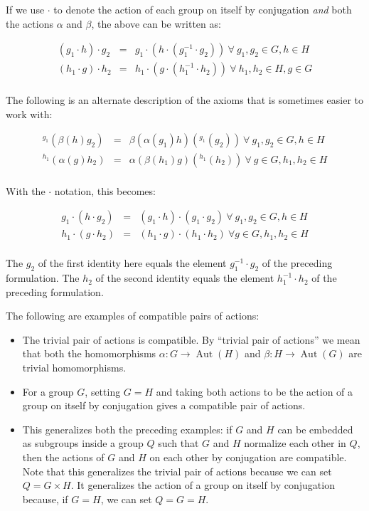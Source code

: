 \documentclass{ucetd}
\begin{document}
If we use $\cdot$ to denote the action of each group on itself by
conjugation {\em and} both the actions $\alpha$ and $\beta$, the above
can be written as:

\begin{eqnarray*}
  (g_1 \cdot h) \cdot g_2 & = & g_1 \cdot (h \cdot (g_1^{-1} \cdot g_2)) \ \forall \ g_1,g_2 \in G, h \in H\\
  (h_1 \cdot g) \cdot h_2 & = & h_1 \cdot (g \cdot (h_1^{-1} \cdot h_2)) \ \forall \ h_1,h_2 \in H, g \in G\\
\end{eqnarray*}

The following is an alternate description of the axioms that is
sometimes easier to work with:

\begin{eqnarray*}
  {}^{g_1}(\beta(h)g_2) & = & \beta(\alpha(g_1)h)({}^{g_1}(g_2)) \ \forall \ g_1,g_2 \in G, h \in H\\ 
  {}^{h_1}(\alpha(g)h_2) & = & \alpha(\beta(h_1)g)({}^{h_1}(h_2)) \ \forall \ g \in G, h_1, h_2 \in H\\
\end{eqnarray*}

With the $\cdot$ notation, this becomes:

\begin{eqnarray*}
  g_1 \cdot (h \cdot g_2) & = & (g_1 \cdot h) \cdot (g_1 \cdot g_2) \ \forall \ g_1,g_2 \in G, h \in H\\
  h_1 \cdot (g \cdot h_2) & = & (h_1 \cdot g) \cdot (h_1 \cdot h_2) \ \forall g \in G, h_1,h_2 \in H\\
\end{eqnarray*}

The $g_2$ of the first identity here equals the element $g_1^{-1}
\cdot g_2$ of the preceding formulation. The $h_2$ of the second
identity equals the element $h_1^{-1} \cdot h_2$ of the
preceding formulation.

The following are examples of compatible pairs of actions:

\begin{itemize}
\item The trivial pair of actions is compatible. By ``trivial pair of
  actions'' we mean that both the homomorphisms $\alpha:G \to
  \operatorname{Aut}(H)$ and $\beta:H \to \operatorname{Aut}(G)$ are
  trivial homomorphisms.
\item For a group $G$, setting $G = H$ and taking both actions to be
  the action of a group on itself by conjugation gives a compatible
  pair of actions.
\item This generalizes both the preceding examples: if $G$ and $H$ can
  be embedded as subgroups inside a group $Q$ such that $G$ and $H$
  normalize each other in $Q$, then the actions of $G$ and $H$ on each
  other by conjugation are compatible. Note that this generalizes the
  trivial pair of actions because we can set $Q = G \times H$. It
  generalizes the action of a group on itself by conjugation because,
  if $G = H$, we can set $Q = G = H$.
\end{itemize}
\end{document}
